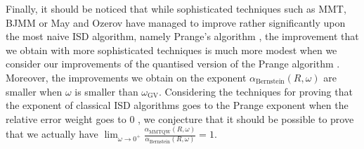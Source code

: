 Finally, it should be noticed that while sophisticated techniques such as MMT, BJMM \cite{MMT11,BJMM12} or May and Ozerov \cite{MO15} have managed to improve rather significantly upon the most naive ISD algorithm, namely Prange's algorithm \cite{P62}, the improvement that we obtain with more sophisticated techniques is much more modest when we consider our improvements of the quantised version of the Prange algorithm \cite{B10}. Moreover, the improvements we obtain on the exponent $\alpha_{\text{Bernstein}}(R,\omega)$ are smaller when $\omega$ is smaller than $\omega_{\text{GV}}$. Considering the techniques for proving that the exponent of classical ISD algorithms goes to the Prange exponent when the 
relative error weight goes to $0$ \cite{CS16}, we conjecture that it should be possible to prove that we actually have $\lim_{\omega \rightarrow 0^+} \frac{\alpha_{\text{MMTQW}}(R,\omega)}{\alpha_{\text{Bernstein}}(R,\omega)} = 1$.

